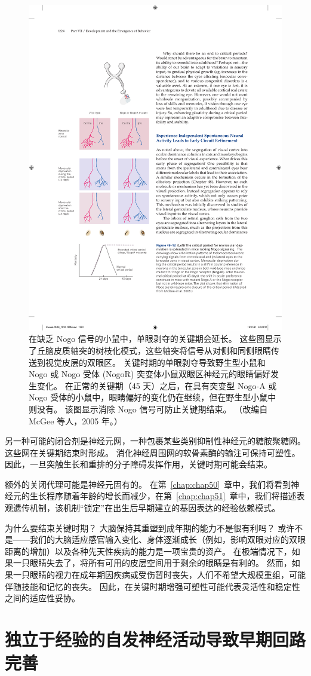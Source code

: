\begin{figure}[htbp]
	\centering
	\includegraphics[width=0.5\linewidth]{chap49/fig_49_12}
	\caption{在缺乏 Nogo 信号的小鼠中，单眼剥夺的关键期会延长。 这些图显示了丘脑皮质轴突的树枝化模式，这些轴突将信号从对侧和同侧眼睛传送到视觉皮层的双眼区。 关键时期的单眼剥夺导致野生型小鼠和 Nogo 或 Nogo 受体 (NogoR) 突变体小鼠双眼区神经元的眼睛偏好发生变化。 在正常的关键期（45 天）之后，在具有突变型 Nogo-A 或 Nogo 受体的小鼠中，眼睛偏好的变化仍在继续，但在野生型小鼠中则没有。 该图显示消除 Nogo 信号可防止关键期结束。 （改编自 McGee 等人，2005 年。）}
	\label{fig:49_12}
\end{figure}


另一种可能的闭合剂是神经元网，一种包裹某些类别抑制性神经元的糖胺聚糖网。
这些网在关键期结束时形成。
消化神经周围网的软骨素酶的输注可保持可塑性。
因此，一旦突触生长和重排的分子障碍发挥作用，关键时期可能会结束。


额外的关闭代理可能是神经元固有的。
在第~\ref{chap:chap50}~章中，我们将看到神经元的生长程序随着年龄的增长而减少，在第~\ref{chap:chap51}~章中，我们将描述表观遗传机制，该机制“锁定”在出生后早期建立的基因表达的经验依赖模式。


为什么要结束关键时期？
大脑保持其重塑到成年期的能力不是很有利吗？
或许不是——我们的大脑适应感官输入变化、身体逐渐成长（例如，影响双眼对应的双眼距离的增加）以及各种先天性疾病的能力是一项宝贵的资产。
在极端情况下，如果一只眼睛失去了，将所有可用的皮层空间用于剩余的眼睛是有利的。
然而，如果一只眼睛的视力在成年期因疾病或受伤暂时丧失，人们不希望大规模重组，可能伴随技能和记忆的丧失。
因此，在关键时期增强可塑性可能代表灵活性和稳定性之间的适应性妥协。



\section{独立于经验的自发神经活动导致早期回路完善}

